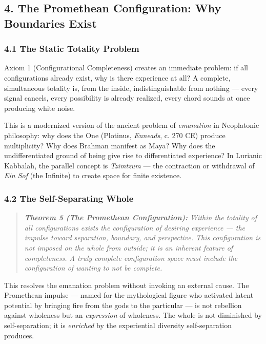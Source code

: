 \bigskip\noindent\makebox[\textwidth]{\color{rulegray}\rule{5cm}{0.3pt}}\bigskip


\subsection*{4. The Promethean Configuration: Why Boundaries Exist}


\subsubsection*{4.1 The Static Totality Problem}


Axiom 1 (Configurational Completeness) creates an immediate problem: if all configurations already exist, why is there experience at all? A complete, simultaneous totality is, from the inside, indistinguishable from nothing — every signal cancels, every possibility is already realized, every chord sounds at once producing white noise.


This is a modernized version of the ancient problem of \textit{emanation} in Neoplatonic philosophy: why does the One (Plotinus, \textit{Enneads}, c. 270 CE) produce multiplicity? Why does Brahman manifest as Maya? Why does the undifferentiated ground of being give rise to differentiated experience? In Lurianic Kabbalah, the parallel concept is \textit{Tzimtzum} — the contraction or withdrawal of \textit{Ein Sof} (the Infinite) to create space for finite existence.


\subsubsection*{4.2 The Self-Separating Whole}


\begin{quote}
\itshape
\textbf{Theorem 5 (The Promethean Configuration):} \textit{Within the totality of all configurations exists the configuration of desiring experience — the impulse toward separation, boundary, and perspective. This configuration is not imposed on the whole from outside; it is an inherent feature of completeness. A truly complete configuration space must include the configuration of wanting to not be complete.}
\end{quote}


This resolves the emanation problem without invoking an external cause. The Promethean impulse — named for the mythological figure who activated latent potential by bringing fire from the gods to the particular — is not rebellion against wholeness but an \textit{expression} of wholeness. The whole is not diminished by self-separation; it is \textit{enriched} by the experiential diversity self-separation produces.


